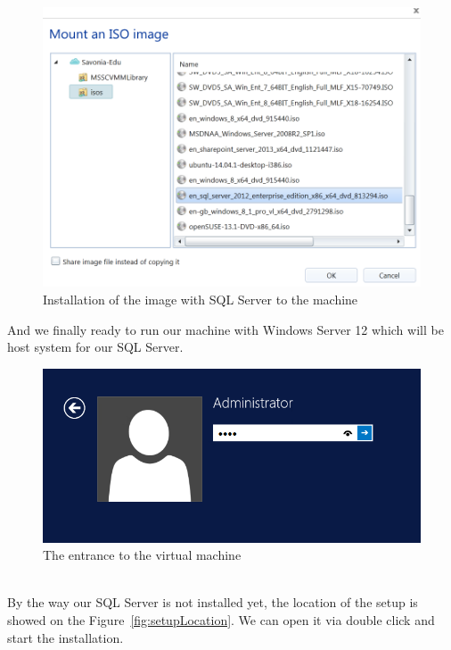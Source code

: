 \documentclass[english]{article}
\begin{document}
\begin{figure}[hb]
\centerline{\includegraphics[scale=0.6]{SQL/isoMounting}}
\caption{Installation of the image with SQL Server to the machine}
\end{figure}
And we finally ready to run our machine with Windows Server 12 which will be host system for our SQL Server.
\begin{figure}[hb]
\centerline{\includegraphics[scale=0.4]{SQL/logIn}}
\caption{The entrance to the virtual machine}
\end{figure}\\
By the way our SQL Server is not installed yet, the location of the setup is showed on the Figure~\ref{fig:setupLocation}. We can open it via double click and start the installation.
\end{document}
